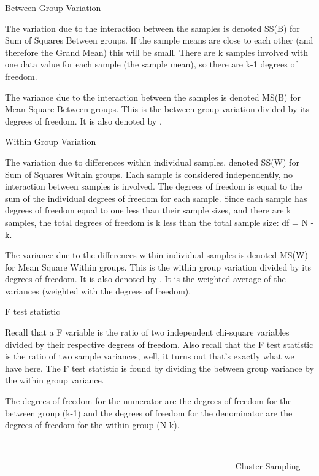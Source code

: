 Between Group Variation


The variation due to the interaction between the samples is denoted SS(B) for Sum of Squares Between groups. If the sample means are close to each other (and therefore the Grand Mean) this will be small. There are k samples involved with one data value for each sample (the sample mean), so there are k-1 degrees of freedom.

The variance due to the interaction between the samples is denoted MS(B) for Mean Square Between groups. This is the between group variation divided by its degrees of freedom. It is also denoted by .

Within Group Variation


The variation due to differences within individual samples, denoted SS(W) for Sum of Squares Within groups. Each sample is considered independently, no interaction between samples is involved. The degrees of freedom is equal to the sum of the individual degrees of freedom for each sample. Since each sample has degrees of freedom equal to one less than their sample sizes, and there are k samples, the total degrees of freedom is k less than the total sample size: df = N - k.


The variance due to the differences within individual samples is denoted MS(W) for Mean Square Within groups. This is the within group variation divided by its degrees of freedom. It is also denoted by . It is the weighted average of the variances (weighted with the degrees of freedom).

F test statistic


Recall that a F variable is the ratio of two independent chi-square variables divided by their respective degrees of freedom. Also recall that the F test statistic is the ratio of two sample variances, well, it turns out that's exactly what we have here. The F test statistic is found by dividing the between group variance by the within group variance. 


The degrees of freedom for the numerator are the degrees of freedom for the between group (k-1) and the degrees of freedom for the denominator are the degrees of freedom for the within group (N-k).







--------------------------------------------------------------------------------




--------------------------------------------------------------------------------
Cluster Sampling 

